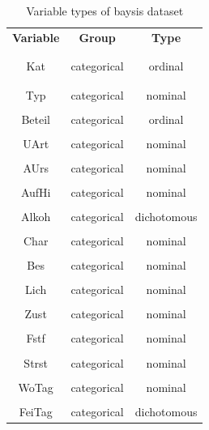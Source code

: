 \documentclass[a4paper,12pt]{report}
\begin{document}
\begin{table}[ht]
	\centering
	\begin{tabular}{c|c|c}
		\textbf{Variable} 	& \textbf{Group} 	& \textbf{Type} 		\\
		\\[-1em]
		\hline
		\\[-1em]
		Kat  		& categorical 	& ordinal 	\\
		\\[-1em]
		\hline
		\\[-1em]
		Typ 		& categorical 	& nominal	\\
		\hline
		\\[-1em]
		Beteil 		& categorical 	& ordinal	\\
		\hline
		\\[-1em]
		UArt 		& categorical 	& nominal	\\
		\hline
		\\[-1em]
		AUrs 		& categorical 	& nominal	\\
		\hline
		\\[-1em]
		AufHi 		& categorical 	& nominal	\\
		\hline
		\\[-1em]
		Alkoh 		& categorical 	& dichotomous	\\
		\hline
		\\[-1em]
		Char 		& categorical 	& nominal	\\
		\hline
		\\[-1em]
		Bes 		& categorical 	& nominal	\\
		\hline
		\\[-1em]
		Lich 		& categorical 	& nominal	\\
		\hline
		\\[-1em]
		Zust 		& categorical 	& nominal	\\
		\hline
		\\[-1em]
		Fstf 		& categorical 	& nominal	\\
		\hline
		\\[-1em]
		Strst 		& categorical 	& nominal	\\
		\hline
		\\[-1em]
		WoTag 		& categorical 	& nominal	\\
		\hline
		\\[-1em]
		FeiTag 		& categorical 	& dichotomous	\\
	\end{tabular}
	\caption{\label{tab:table-name}Variable types of \acrshort{baysis} dataset}
\end{table}
\end{document}
